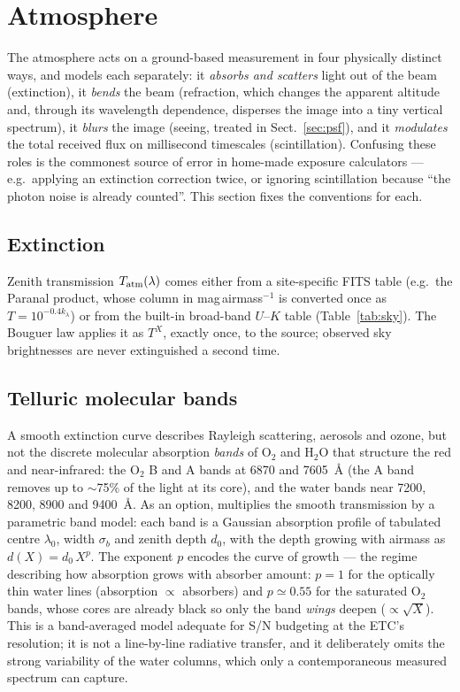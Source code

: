 \section{Atmosphere}
\label{sec:atmosphere}

The atmosphere acts on a ground-based measurement in four physically
distinct ways, and \spetc{} models each separately: it \emph{absorbs and
scatters} light out of the beam (extinction), it \emph{bends} the beam
(refraction, which changes the apparent altitude and, through its
wavelength dependence, disperses the image into a tiny vertical
spectrum), it \emph{blurs} the image (seeing, treated in
Sect.~\ref{sec:psf}), and it \emph{modulates} the total received flux on
millisecond timescales (scintillation). Confusing these roles is the
commonest source of error in home-made exposure calculators --- e.g.\
applying an extinction correction twice, or ignoring scintillation
because ``the photon noise is already counted''. This section fixes the
conventions for each.

\subsection{Extinction}

Zenith transmission $T_{\rm atm}(\lambda)$ comes either from a
site-specific FITS table (e.g.\ the Paranal product, whose
 column in mag\,airmass$^{-1}$ is converted once as
$T=10^{-0.4k_\lambda}$) or from the built-in broad-band $U$--$K$ table
(Table~\ref{tab:sky}). The Bouguer law applies it as $T^{X}$, exactly once,
to the source; observed sky brightnesses are never extinguished a second
time.

\subsection{Telluric molecular bands}
\label{sec:telluric}

A smooth extinction curve describes Rayleigh scattering, aerosols and
ozone, but not the discrete molecular absorption \emph{bands} of O$_2$ and
H$_2$O that structure the red and near-infrared: the O$_2$ B and A bands
at 6870 and \SI{7605}{\angstrom} (the A band removes up to
$\sim$75\% of the light at its core), and the water bands near 7200,
8200, 8900 and \SI{9400}{\angstrom}. As an option, \spetc{} multiplies the
smooth transmission by a parametric band model: each band is a Gaussian
absorption profile of tabulated centre $\lambda_0$, width $\sigma_b$ and
zenith depth $d_0$, with the depth growing with airmass as
$d(X) = d_0\,X^{p}$. The exponent $p$ encodes the curve of growth — the
regime describing how absorption grows with absorber amount: $p = 1$ for
the optically thin water lines (absorption $\propto$ absorbers) and
$p \simeq 0.55$ for the saturated O$_2$ bands, whose cores are already
black so only the band \emph{wings} deepen ($\propto \sqrt{X}$). This is
a band-averaged model adequate for S/N budgeting at the ETC's resolution;
it is not a line-by-line radiative transfer, and it deliberately omits
the strong variability of the water columns, which only a contemporaneous
measured spectrum can capture.

